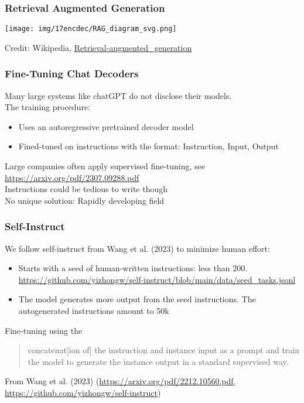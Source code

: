 \begin{frame}[fragile]
\frametitle{Retrieval Augmented Generation}\color{structure}
\begin{center}
 \texttt{[image: img/17encdec/RAG\_diagram\_svg.png]}
\end{center}

Credit: Wikipedia, \url{Retrieval-augmented_generation}
\end{frame}

\begin{frame}[fragile]
\frametitle{Fine-Tuning Chat Decoders}\color{structure}
Many large systems like chatGPT do not disclose their models.\\
The training procedure:
\begin{itemize}\color{structure}
\item Uses an autoregressive pretrained decoder model
\item Fined-tuned on instructions with the format: Instruction, Input, Output
\end{itemize}
Large companies often apply supervised fine-tuning, see \url{https://arxiv.org/pdf/2307.09288.pdf}\\
Instructions could be tedious to write though\\
No unique solution: Rapidly developing field
\end{frame}

\begin{frame}[fragile]
\frametitle{Self-Instruct}\color{structure}
We follow self-instruct from Wang et al. (2023) to minimize human effort:
\begin{itemize}\color{structure}
\item Starts with a seed of human-written instructions: less than 200. \url{https://github.com/yizhongw/self-instruct/blob/main/data/seed_tasks.jsonl}
\item The model generates more output from the seed instructions. The autogenerated instructions amount to 50k
\end{itemize}
Fine-tuning using the 
\begin{quote}\color{structure}
concatenat[ion of] the instruction and instance input as a prompt and train the model to generate the instance output in a standard supervised way.
\end{quote}
From Wang et al. (2023) (\url{https://arxiv.org/pdf/2212.10560.pdf}, \url{https://github.com/yizhongw/self-instruct})
\end{frame}

